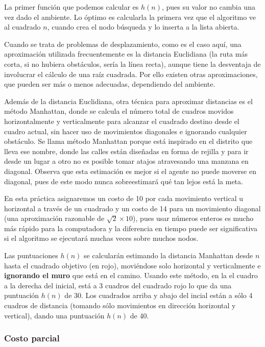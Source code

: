 La primer función que podemos calcular es \(h(n)\), pues su valor no cambia una vez dado el ambiente.  Lo óptimo es calcularla la primera vez que el algoritmo ve al cuadrado \(n\), cuando crea el nodo búsqueda y lo inserta a la lista abierta.

Cuando se trata de problemas de desplazamiento, como es el caso aquí, una aproximación utilizada frecuentemente es la distancia Euclidiana (la ruta más corta, si no hubiera obstáculos, sería la línea recta), aunque tiene la desventaja de involucrar el cálculo de una raíz cuadrada. Por ello existen otras aproximaciones, que pueden ser más o menos adecuadas, dependiendo del ambiente.

Además de la distancia Euclidiana, otra técnica para aproximar distancias es el método Manhattan, donde se calcula el número total de cuadros movidos horizontalmente y verticalmente para alcanzar el cuadrado destino desde el cuadro actual, sin hacer uso de movimientos diagonales e ignorando cualquier obstáculo. Se llama método Manhattan porque está inspirado en el distrito que lleva ese nombre, donde las calles están diseñadas en forma de rejilla y para ir desde un lugar a otro no es posible tomar atajos atravesando una manzana en diagonal.  Observa que esta estimación es mejor si el agente no puede moverse en diagonal, pues de este modo nunca sobreestimará qué tan lejos está la meta.

En esta práctica asignaremos un costo de 10 por cada movimiento vertical u horizontal a través de un cuadrado y un costo de 14 para un movimiento diagonal (una aproximación razonable de \(\sqrt{2}\times10\)), pues usar números enteros es mucho más rápido para la computadora y la diferencia en tiempo puede ser significativa si el algoritmo se ejecutará muchas veces sobre muchos nodos.

Las puntuaciones \(h(n)\) se calcularán estimando la distancia Manhattan desde $n$ hasta el cuadrado objetivo (en rojo), moviéndose solo horizontal y verticalmente e \textbf{ignorando el muro} que está en el camino. Usando este método, en la  el cuadro a la derecha del inicial, está a 3 cuadros del cuadrado rojo lo que da una puntuación \(h(n)\) de 30. Los cuadrados arriba y abajo del incial están a sólo 4 cuadros de distancia (tomando sólo movimientos en dirección horizontal y vertical), dando una puntuación \(h(n)\) de 40.


\subsubsection{Costo parcial}

